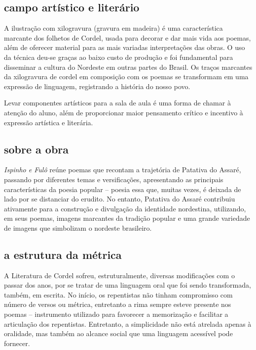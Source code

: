 \documentclass[12pt]{extarticle}
\begin{document}
\subsection{campo artístico e literário}

A ilustração com xilogravura (gravura em madeira) é uma característica
marcante dos folhetos de Cordel, usada para decorar e dar mais vida aos
poemas, além de oferecer material para as mais variadas interpretações
das obras. O uso da técnica deu-se graças ao baixo custo de produção e
foi fundamental para disseminar a cultura do Nordeste em outras partes
do Brasil. Os traços marcantes da xilogravura de cordel em composição
com os poemas se transformam em uma expressão de linguagem, registrando
a história do nosso povo.

Levar componentes artísticos para a sala de aula é uma forma de chamar à
atenção do aluno, além de proporcionar maior pensamento crítico e
incentivo à expressão artística e literária.


\subsection{sobre a obra }

\emph{Ispinho e Fulô} reúne poemas que recontam a trajetória de Patativa
do Assaré, passando por diferentes temas e versificações, apresentando
as principais características da poesia popular -- poesia essa que,
muitas vezes, é deixada de lado por se distanciar do erudito. No
entanto, Patativa do Assaré contribuiu ativamente para a construção e
divulgação da identidade nordestina, utilizando, em seus poemas, imagens
marcantes da tradição popular e uma grande variedade de imagens que
simbolizam o nordeste brasileiro.

\subsection{a estrutura da métrica}

A Literatura de Cordel sofreu, estruturalmente, diversas modificações
com o passar dos anos, por se tratar de uma linguagem oral que foi sendo
transformada, também, em escrita. No início, os repentistas não tinham
compromisso com número de versos ou métrica, entretanto a rima sempre
esteve presente nos poemas -- instrumento utilizado para favorecer a
memorização e facilitar a articulação dos repentistas. Entretanto, a
simplicidade não está atrelada apenas à oralidade, mas também ao alcance
social que uma linguagem acessível pode fornecer.
\end{document}
